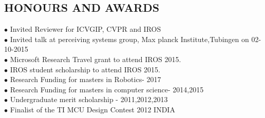 \documentclass[7pt]{article}
\begin{document}
\begin{small}



\vspace{-4 mm}

\section{HONOURS AND AWARDS}
$\bullet$  Invited Reviewer for ICVGIP, CVPR and IROS\\
$\bullet$  Invited talk at perceiving systems group, Max planck Institute,Tubingen on 02-10-2015\\
$\bullet$  Microsoft Research Travel grant to attend IROS 2015.\\
$\bullet$ IROS student scholarship to attend IROS 2015.\\
$\bullet$ Research Funding for masters in Robotics- 2017\\
$\bullet$ Research Funding for masters in computer science- 2014,2015\\
$\bullet$  Undergraduate merit scholarship - 2011,2012,2013\\
$\bullet$  Finalist of the TI MCU Design Contest 2012 INDIA \\




\end{small}
\end{document}
